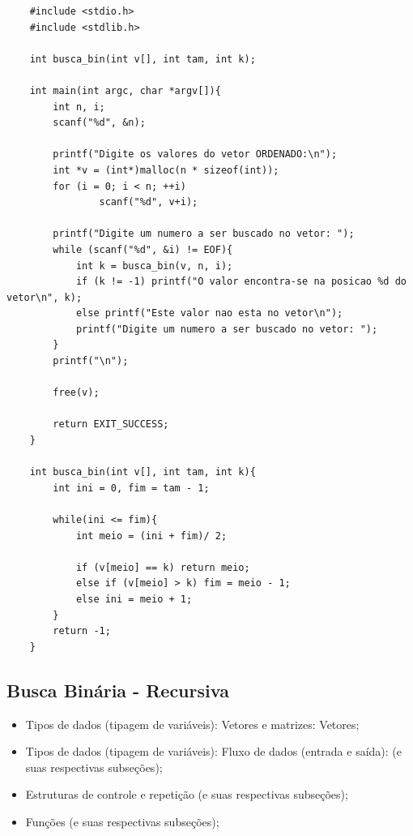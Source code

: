 \documentclass[12pt]{article}
\begin{document}
\hspace{0.25cm}
\begin{lstlisting}
    #include <stdio.h>
    #include <stdlib.h>
    
    int busca_bin(int v[], int tam, int k);
    
    int main(int argc, char *argv[]){
        int n, i;
        scanf("%d", &n);
        
    	printf("Digite os valores do vetor ORDENADO:\n");
        int *v = (int*)malloc(n * sizeof(int));
        for (i = 0; i < n; ++i)
                scanf("%d", v+i);
        
    	printf("Digite um numero a ser buscado no vetor: ");
        while (scanf("%d", &i) != EOF){
    		int k = busca_bin(v, n, i);
    		if (k != -1) printf("O valor encontra-se na posicao %d do vetor\n", k);
    		else printf("Este valor nao esta no vetor\n");
    		printf("Digite um numero a ser buscado no vetor: ");
    	}
    	printf("\n");
    	
    	free(v);
            
        return EXIT_SUCCESS;
    }
    
    int busca_bin(int v[], int tam, int k){
    	int ini = 0, fim = tam - 1;
    	
    	while(ini <= fim){
    		int meio = (ini + fim)/ 2;
    		
    		if (v[meio] == k) return meio;
    		else if (v[meio] > k) fim = meio - 1;
    		else ini = meio + 1;
    	}
    	return -1;
    }
\end{lstlisting}

\newpage
\subsection{Busca Binária - Recursiva}

\hspace{0.25cm}
\begin{tcolorbox}[colback=violet!5!white,colframe=violet!75!white,title=Capítulos recomendados:]
    \begin{itemize}
        \item Tipos de dados (tipagem de variáveis): Vetores e matrizes: Vetores;
        \item Tipos de dados (tipagem de variáveis): Fluxo de dados (entrada e saída): (e suas respectivas subseções);
        \item Estruturas de controle e repetição (e suas respectivas subseções);
        \item Funções (e suas respectivas subseções);
    \end{itemize}
\end{tcolorbox}
\end{document}
